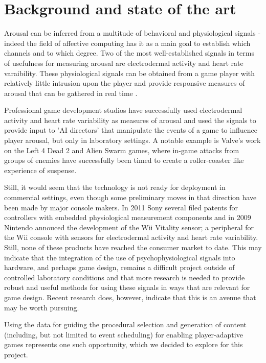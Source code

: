 \documentclass{llncs}
\begin{document}
\section{Background and state of the art}
Arousal can be inferred from a multitude of behavioral and physiological signals - indeed the field of affective computing has it as a main goal to establish which channels and to which degree. Two of the most well-established signals in terms of usefulness for measuring arousal are electrodermal activity and heart rate varaibility. 
These physiological signals can be obtained from a game player with relatively little intrusion upon the player and provide responsive measures of arousal that can be gathered in real time \cite{picard1997affective,boucsein2011electrodermal}.

Professional game development studios have successfully used electrodermal activity and heart rate variability as measures of arousal and used the signals to provide input to 'AI directors' that manipulate the events of a game to influence player arousal, but only in laboratory settings.
A notable example is Valve's work on the Left 4 Dead 2 and Alien Swarm games, where in-game attacks from groups of enemies have successfully been timed to create a roller-coaster like experience of suspense.\cite{ambinder2011}

Still, it would seem that the technology is not ready for deployment in commercial settings, even though some preliminary moves in that direction have been made by major console makers. In 2011 Sony several filed patents for controllers with embedded physiological measurement components\cite{sonypatent} and in 2009 Nintendo annouced the development of the Wii Vitality sensor; a peripheral for the Wii console with sensors for electrodermal activity and heart rate variability\cite{wiivitality}.
Still, none of these products have reached the consumer market to date. This may indicate that the integration of the use of psychophysiological signals into hardware, and perhaps game design, remains a difficult project outside of controlled laboratory conditions and that more research is needed to provide robust and useful methods for using these signals in ways that are relevant for game design. Recent research does, however, indicate that this is an avenue that may be worth pursuing\cite{perez2011generic}.

Using the data for guiding the procedural selection and generation of content (including, but not limited to event scheduling) for enabling player-adaptive games represents one such opportunity, which we decided to explore for this project.
\end{document}
